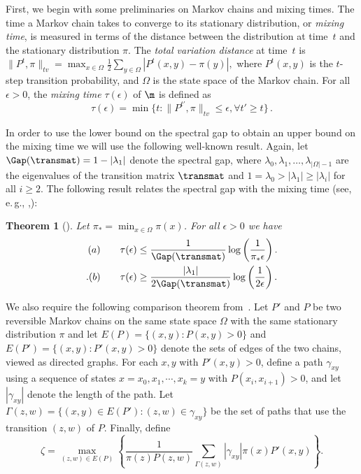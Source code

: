 \documentclass[11pt]{article}
\newtheorem{theorem}{Theorem}[section]
\providecommand{\eg}{e.\,g.}
\begin{document}
First, we begin with some preliminaries on Markov chains and mixing 
times.  The time a Markov chain takes to converge to its stationary 
distribution, or \emph{mixing time}, is measured in terms of the 
distance between the distribution at time~$t$ and the stationary 
distribution $\pi$. %
 The \emph{total variation distance} at time~$t$ is 
$\|P^t,\pi\| _{tv} = \max_{x\in\Omega}\frac{1}{2}\sum_{y\in\Omega} 
|P^t(x,y)-\pi(y)|,$  %
where $P^t(x,y)$ is the $t$-step transition 
probability, 
and $\Omega$ is the state space of the Markov chain.  %
For all $\epsilon>0$, the \emph{mixing time} 
$\tau(\epsilon)$ of $\m$ is defined as
$$\tau(\epsilon)=\min \{t: \|P^{t'},\pi \|_{tv}\leq \epsilon, \forall t' \geq t\}\,.$$ 

In order to use the lower bound on the spectral gap to obtain an upper bound on the mixing time we will use the following well-known result. 
Again, let $\Gap(\transmat)=1-|\lambda_1|$ denote the spectral gap, where $\lambda_0, \lambda_1, \ldots, \lambda_{|\Omega|-1}$ are the eigenvalues of the transition matrix $\transmat$ and $1=\lambda_0>|\lambda_1|\geq |\lambda_i|$ for all $i\geq 2$. The following result  relates the spectral gap with the mixing time (see, \eg, \cite{sinclair},\cite{RM03}):

%
\begin{theorem}[\cite{RM03}]\label{gap}
Let $\pi_*=\min_{x\in\Omega} \pi (x)$. For all $\epsilon>0$ we have
\begin{align*}
(a)\qquad \tau(\epsilon)&\leq \frac{1}{\Gap(\transmat)} \log\left(\frac{1}{\pi_*\epsilon}\right).\\. %
(b)\qquad \tau(\epsilon)&\geq \frac{|\lambda_1|}{2\Gap(\transmat)} \log\left(\frac{1}{2\epsilon}\right).
%
%
\end{align*}
\end{theorem}
%
%

We also require the following comparison theorem
%
%
{}from~\cite{dsc}.   %
Let $P'$ and $P$ be two
reversible Markov chains on the same state space $\Omega$ with the same 
stationary distribution $\pi$ and let $E(P) = \{(x,y): P(x,y) >
0\}$ and $E(P') = \{(x,y): P'(x,y) > 0\}$ denote the sets of edges of
the two chains, viewed as directed graphs.  For each $x,y$ with
$P'(x,y)>0$, define a path $\gamma_{xy}$ using a sequence of states
$x=x_0,x_1,\cdots,x_k = y$ with $P(x_i,x_{i+1})>0$, and let
$|\gamma_{xy}|$ denote the length of the path.  Let $\Gamma(z,w) =
\{(x,y) \in E(P'): (z,w) \in \gamma_{xy}\}$ be the set of paths that
use the transition $(z,w)$ of $P$.  Finally, define  
\abovedisplayskip=3pt
\belowdisplayskip=3pt
\begin{equation}\label{eqn:zeta}
\zeta = \max_{(z,w) \in E(P)} \left \{\frac{1}{\pi(z)P(z,w)}
\sum_{\Gamma(z,w)}|\gamma_{xy}|\pi(x)P'(x,y) \right \}.
\end{equation}
\end{document}
